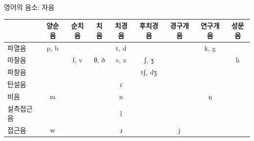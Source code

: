 \documentclass[11pt, aspectratio=169]{beamer}
\newcommand{\textds}[1]{{\ipafont #1}}
\begin{document}
\begin{frame}[t]{영어의 음소: 자음}
    \begin{tabular}{lcccccccc}
        \hline
         & \textbf{양순음} & \textbf{순치음} & \textbf{치음} & \textbf{치경음} & \textbf{후치경음} & \textbf{경구개음} & \textbf{연구개음} & \textbf{성문음} \\
        \hline
        파열음 & \textds{p, b} & & & \textds{t, d} & & & \textds{k, g}& \\
        \hline
        마찰음  & & \textds{f, v} & \textds{θ, ð} & \textds{s, z} & \textds{ʃ, ʒ} & & & \textds{h}\\
        \hline
        파찰음  & & & & & \textds{tʃ, dʒ} & & & \\
        \hline
        탄설음  & & & & \textds{ɾ} & & & & \\
        \hline
        비음  & \textds{m} & & & \textds{n} & & & \textds{ŋ}& \\
        \hline
        설측접근음  & & & & \textds{l} & & & & \\
        \hline
        접근음  & \textds{w} & & & \textds{ɹ} & & \textds{j} & & \\
        \hline

    \end{tabular}
\end{frame}
\end{document}
